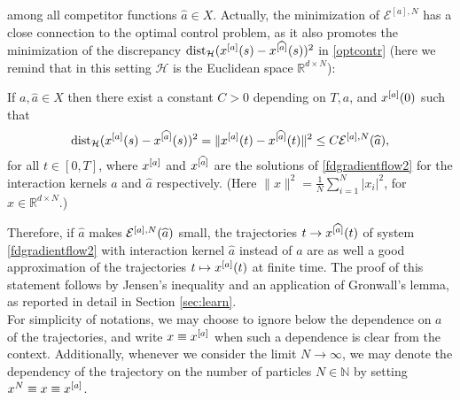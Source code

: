 among all competitor functions $\widehat a \in X$. 
Actually, the minimization of $\mathcal E^{[a],N}$ has a close connection to the optimal control problem, as it also promotes the minimization of the discrepancy $ \operatorname{dist}_{\mathcal H}(x^{[a]}(s) - x^{[\widehat a]}(s))^2$ in  \eqref{optcontr} (here we remind that in this setting $\mathcal H$ is the Euclidean space $\mathbb R^{d \times N}$):
\begin{proposition}\label{trajapprox}
If $a,\widehat a \in X$ then there exist a constant $C>0$ depending on $T, a$, and $x^{[a]}(0)$ such that
\begin{equation}\label{eq:trajapprox}
 \operatorname{dist}_{\mathcal H}(x^{[a]}(s) - x^{[\widehat a]}(s))^2= \| x^{[a]} (t) -x^{[\widehat a]}  (t) \|^2 \leq C {\mathcal E^{[a],N}(\widehat a)}, 
\end{equation}
for all $t \in [0,T]$, where $x^{[a]}$ and  $x^{[\widehat a]}  $ are the solutions of \eqref{fdgradientflow2} for the interaction kernels $a$ and $\widehat a$ respectively. (Here $\| x \|^2 = \frac{1}{N} \sum_{i=1}^N |x_i|^2$, for $x \in \mathbb R^{d \times N}$.)
\end{proposition}
Therefore, if $\widehat a$ makes $\mathcal E^{[a],N}(\widehat a)$ small, the trajectories $t\to x^{[\widehat a]}(t)$ of  system \eqref{fdgradientflow2} with interaction kernel $\widehat a$ instead of $a$ are as well a good approximation of the trajectories $t \mapsto x^{[a]}(t)$ at finite time. 
The proof of this statement follows by Jensen's inequality and an application of Gronwall's lemma, as reported in detail in Section \ref{sec:learn}. \\

 For simplicity of notations, we may choose to ignore below the dependence on $a$ of the trajectories,  and write $x \equiv x^{[a]}$ when such a dependence is clear from the context. Additionally, whenever we consider the limit $N \to \infty$,  we may denote the dependency of the trajectory on the number of particles $N \in \mathbb N$ by setting $x^N\equiv x \equiv x^{[a]}$.
\\

